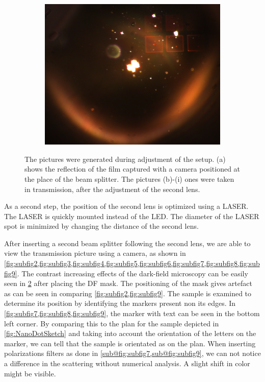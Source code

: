 \begin{figure}[ht]
\begin{subfigure}{0.3\linewidth}
      \includegraphics[width=\linewidth]{data/Gruppe2/image_8.png}
      \caption{}
      \label{fig:subfig9}
    \end{subfigure}
    
    \caption{The pictures were generated during adjustment of the setup. (a) shows the reflection of the film captured with a camera positioned at the place of the beam splitter. The pictures (b)-(i) ones were taken in transmission, after the adjustment of the second lens.}
    \label{fig:subfigure-grid}
\end{figure}

As a second step, the position of the second lens is optimized using a LASER. The LASER is quickly mounted instead of the LED. The diameter of the LASER spot is minimized by changing the distance of the second lens.

After inserting a second beam splitter following the second lens, we are able to view the transmission picture using a camera, as shown in \cref{fig:subfig2,fig:subfig3,fig:subfig4,fig:subfig5,fig:subfig6,fig:subfig7,fig:subfig8,fig:subfig9}. The contrast increasing effects
of the dark-field microscopy can be easily seen in \cref{fig:subfigure-grid} after placing the DF mask. The positioning of the mask gives artefact as can be seen in comparing \cref{fig:subfig2,fig:subfig9}. The sample is examined to determine its position by identifying the markers present non its edges. In \cref{fig:subfig7,fig:subfig8,fig:subfig9}, the marker with text can be seen in the bottom left corner. 
By comparing this to the plan for the sample depicted in \cref{fig:NanoDotSketch} and taking into account the orientation of the 
letters on the marker, we can tell that the sample is orientated as on the plan. When inserting polarizations filters as done in \cref{sub@fig:subfig7,sub@fig:subfig9}, we can not notice a difference in the scattering without numerical analysis. A slight shift in color might be visible.  
 

